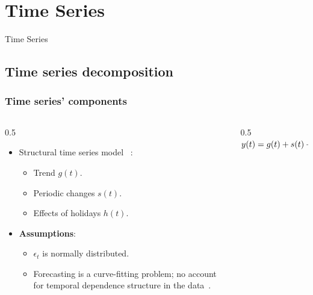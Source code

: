 \section{Time Series}

\begin{frame}
  Time Series
\end{frame}

\subsection{Time series decomposition}

\begin{frame}
  \frametitle{Time series' components}
  \begin{columns}
    \begin{column}{0.5\textwidth}
      \begin{itemize}
        \item Structural time series model ~\cite{harvey1990}:
        \begin{itemize}
          \item Trend $g(t)$.
          \item Periodic changes $s(t)$.
          \item Effects of holidays $h(t)$.
        \end{itemize}
        \item \textbf{Assumptions}:
        \begin{itemize}
          \item $\epsilon_{t}$ is normally distributed.
          \item Forecasting is a curve-fitting problem; no account for temporal
            dependence structure in the data~\cite{taylor2018}.
        \end{itemize}
      \end{itemize}
    \end{column}
    \begin{column}{0.5\textwidth}
      \begin{math}
        \centering
        y(t) = g(t) + s(t) + h(t) + \epsilon_{t}
      \end{math}
    \end{column}
  \end{columns}
\end{frame}

